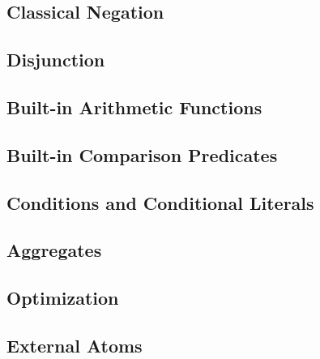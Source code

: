 \documentclass[14pt,a4paper, titlepage]{article}
\begin{document}
\subsection{Classical Negation}
\subsection{Disjunction}
\subsection{Built-in Arithmetic Functions}
\subsection{Built-in Comparison Predicates}
\subsection{Conditions and Conditional Literals}
\subsection{Aggregates}
\subsection{Optimization}
\subsection{External Atoms}
\end{document}
